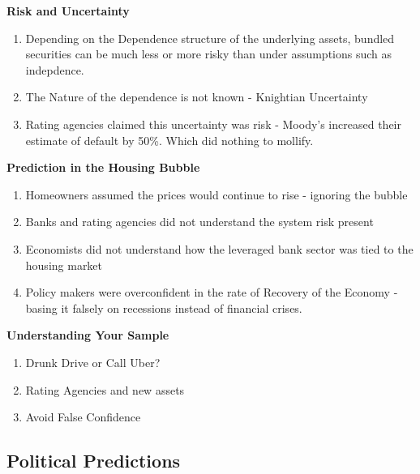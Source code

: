 \documentclass[grey,handout]{beamer}
\renewcommand{\frametitle}[1]{\begin{center}\textbf{#1}\end{center}}
\begin{document}
\begin{frame}
  \frametitle{Risk and Uncertainty}
  \begin{enumerate}
  \item Depending on the Dependence structure of the underlying
    assets, bundled securities can be much less or more risky than
    under assumptions such as indepdence.
  \item The Nature of the dependence is not known - Knightian
    Uncertainty
  \item Rating agencies claimed this uncertainty was risk - Moody's
    increased their estimate of default by 50\%. Which did nothing to mollify.
  \end{enumerate}
\end{frame}

\begin{frame}
  \frametitle{Prediction in the Housing Bubble}
  \begin{enumerate}
  \item Homeowners assumed the prices would continue to rise -
    ignoring the bubble
  \item Banks and rating agencies did not understand the system risk present
  \item Economists did not understand how the leveraged bank sector
    was tied to the housing market
  \item Policy makers were overconfident in the rate of Recovery of
    the Economy - basing it falsely on recessions instead of financial crises.
  \end{enumerate}
\end{frame}

\begin{frame}
  \frametitle{Understanding Your Sample}
  \begin{enumerate}
  \item Drunk Drive or Call Uber?
  \item Rating Agencies and new assets
  \item Avoid False Confidence
  \end{enumerate}
\end{frame}


\subsection{Political Predictions}

\begin{frame}
  \frametitle{}
\end{frame}
\end{document}
